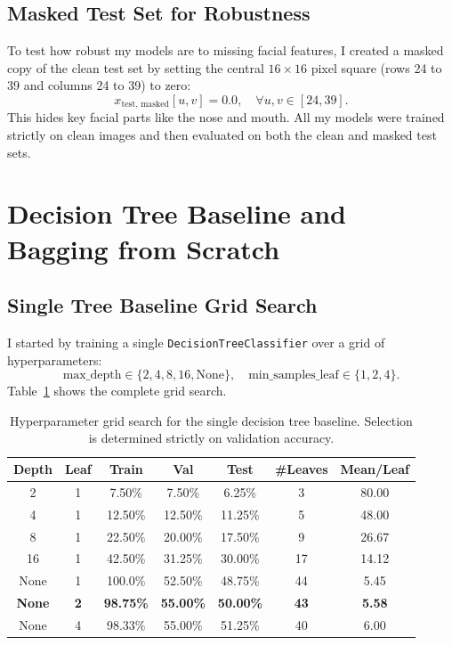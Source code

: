 \documentclass[10pt,twocolumn,letterpaper]{article}
\begin{document}
\subsection{Masked Test Set for Robustness}
To test how robust my models are to missing facial features, I created a masked copy of the clean test set by setting the central $16 \times 16$ pixel square (rows 24 to 39 and columns 24 to 39) to zero:
\begin{equation}
    x_{\text{test, masked}}[u, v] = 0.0, \quad \forall u, v \in [24, 39].
\end{equation}
This hides key facial parts like the nose and mouth. All my models were trained strictly on clean images and then evaluated on both the clean and masked test sets.

\section{Decision Tree Baseline and Bagging from Scratch}
\label{sec:q1}

\subsection{Single Tree Baseline Grid Search}
I started by training a single \texttt{DecisionTreeClassifier} over a grid of hyperparameters:
\begin{equation*}
    \text{max\_depth} \in \{2, 4, 8, 16, \text{None}\}, \quad \text{min\_samples\_leaf} \in \{1, 2, 4\}.
\end{equation*}
Table~\ref{tab:q1_grid} shows the complete grid search.

\begin{table}[h]
\centering
\small
\caption{Hyperparameter grid search for the single decision tree baseline. Selection is determined strictly on validation accuracy.}
\label{tab:q1_grid}
\begin{tabular}{ccccccc}
\toprule
Depth & Leaf & Train & Val & Test & \#Leaves & Mean/Leaf \\
\midrule
2 & 1 & 7.50\% & 7.50\% & 6.25\% & 3 & 80.00 \\
4 & 1 & 12.50\% & 12.50\% & 11.25\% & 5 & 48.00 \\
8 & 1 & 22.50\% & 20.00\% & 17.50\% & 9 & 26.67 \\
16 & 1 & 42.50\% & 31.25\% & 30.00\% & 17 & 14.12 \\
None & 1 & 100.0\% & 52.50\% & 48.75\% & 44 & 5.45 \\
\textbf{None} & \textbf{2} & \textbf{98.75\%} & \textbf{55.00\%} & \textbf{50.00\%} & \textbf{43} & \textbf{5.58} \\
None & 4 & 98.33\% & 55.00\% & 51.25\% & 40 & 6.00 \\
\bottomrule
\end{tabular}
\end{table}
\end{document}
